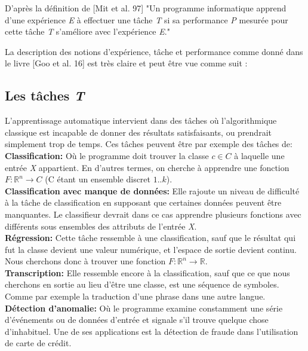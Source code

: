 	D'après la définition de [Mit et al. 97] "Un programme informatique apprend d'une expérience \textit{E} à effectuer une tâche \textit{T} si sa performance \textit{P} mesurée pour cette tâche \textit{T} s'améliore avec l’expérience \textit{E}."

	La description des notions d'expérience, tâche et performance comme donné dans le livre [Goo et al. 16] est très claire et peut être vue comme suit :

\subsection{Les tâches \textit{T}} 
	L'apprentissage automatique intervient dans des tâches où l'algorithmique classique est incapable de donner des résultats satisfaisants, ou prendrait simplement trop de temps. Ces tâches peuvent être par exemple des tâches de:\\

\textbf{Classification:} Où le programme doit trouver la classe $c \in C$ à laquelle une entrée \textit{X} appartient. En d'autres termes, on cherche à apprendre une fonction $F : \mathbb{R}^{n} \rightarrow C$ (C étant un ensemble discret ${1..k}$).\\

\textbf{Classification avec manque de données:} Elle rajoute un niveau de difficulté à la tâche de classification en supposant que certaines données peuvent être manquantes. Le classifieur devrait dans ce cas apprendre plusieurs fonctions avec différents sous ensembles des attributs de l'entrée \textit{X}.\\

\textbf{Régression:} Cette tâche ressemble à une classification, sauf que le résultat qui fut la classe devient une valeur numérique, et l'espace de sortie devient continu. Nous cherchons donc à trouver une fonction $F : \mathbb{R}^{n} \rightarrow \mathbb{R}$.\\

\textbf{Transcription:} Elle ressemble encore à la classification, sauf que ce que nous cherchons en sortie au lieu d’être une classe, est une séquence de symboles. Comme par exemple la traduction d'une phrase dans une autre langue.\\

\textbf{Détection d'anomalie:} Où le programme examine constamment une série d’événements ou de données d'entrée et signale s'il trouve quelque chose d'inhabituel. Une de ses applications est la détection de fraude dans l'utilisation de carte de crédit.\\

